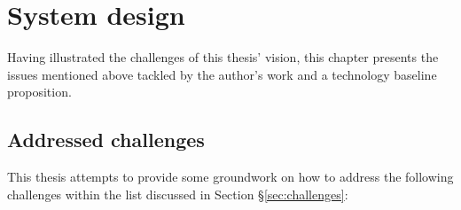 \section{System design}
\label{sec:technicals}

Having illustrated the challenges of this thesis' vision, this chapter presents the issues mentioned above tackled by the author's work and a technology baseline proposition.

\subsection{Addressed challenges}

This thesis attempts to provide some groundwork on how to address the following challenges within the list discussed in Section §\ref{sec:challenges}:

